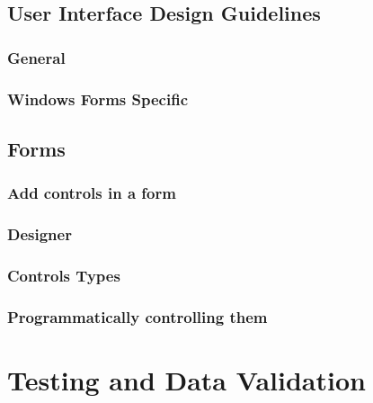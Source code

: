 \documentclass[
]{book}
\begin{document}
\hypertarget{user-interface-design-guidelines}{%
\section{User Interface Design Guidelines}\label{user-interface-design-guidelines}}

\hypertarget{general}{%
\subsection{General}\label{general}}

\hypertarget{windows-forms-specific}{%
\subsection{Windows Forms Specific}\label{windows-forms-specific}}

\hypertarget{forms}{%
\section{Forms}\label{forms}}

\hypertarget{add-controls-in-a-form}{%
\subsection{Add controls in a form}\label{add-controls-in-a-form}}

\hypertarget{designer}{%
\subsection{Designer}\label{designer}}

\hypertarget{controls-types}{%
\subsection{Controls Types}\label{controls-types}}

\hypertarget{programmatically-controlling-them}{%
\subsection{Programmatically controlling them}\label{programmatically-controlling-them}}

\hypertarget{testing-and-data-validation}{%
\chapter{Testing and Data Validation}\label{testing-and-data-validation}}
\end{document}
